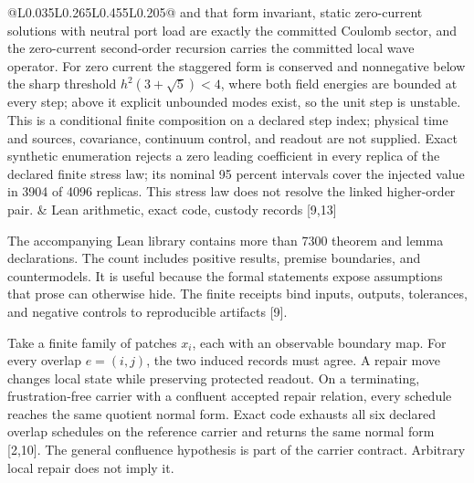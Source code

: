 \documentclass[10pt]{article}
\newcommand{\sect}[1]{\vspace{0.44em}{\large\bfseries\color{pragmaCyanText}#1}\par\vspace{0.02em}}
\begin{document}
\begin{center}
\begin{longtable}{@{}L{0.035\linewidth}L{0.265\linewidth}L{0.455\linewidth}L{0.205\linewidth}@{}}
and that form invariant, static zero-current solutions with neutral port load
are exactly the committed Coulomb sector, and the zero-current second-order
recursion carries the committed local wave operator. For zero current the
staggered form is conserved and nonnegative below the sharp threshold
$h^2(3+\sqrt5)<4$, where both field energies are bounded at every step;
above it explicit unbounded modes exist, so the unit step is unstable.
This is a conditional finite composition on a declared step index; physical
time and sources, covariance, continuum control, and readout are not supplied.
Exact synthetic enumeration rejects a zero leading coefficient in every
replica of the declared finite stress law; its nominal 95 percent intervals
cover the injected value in 3904 of 4096 replicas. This stress law does not
resolve the linked higher-order pair. &
Lean arithmetic, exact code, custody records [9,13]\\
\bottomrule
\end{longtable}
\end{center}

The accompanying Lean library contains more than 7300 theorem and lemma declarations.
The count includes positive results, premise boundaries, and countermodels.
It is useful because the formal statements expose assumptions that prose can
otherwise hide. The finite receipts bind inputs, outputs, tolerances, and
negative controls to reproducible artifacts [9].

\sect{2. Public reality and quantum records}

Take a finite family of patches \(x_i\), each with an observable boundary map.
For every overlap \(e=(i,j)\), the two induced records must agree. A repair
move changes local state while preserving protected readout. On a terminating,
frustration-free carrier with a confluent accepted repair relation, every
schedule reaches the same quotient normal form. Exact code exhausts all six
declared overlap schedules on the reference carrier and returns the same
normal form [2,10]. The general confluence hypothesis is part of the carrier
contract. Arbitrary local repair does not imply it.
\end{document}
